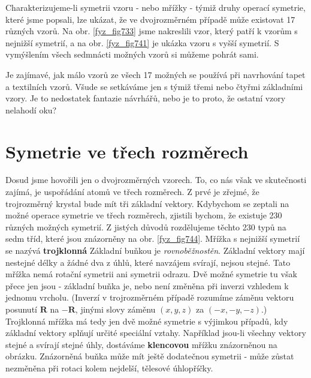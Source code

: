     Charakterizujeme-li symetrii vzoru - nebo mřížky - týmiž druhy operací symetrie, které jsme 
    popsali, lze ukázat, že ve dvojrozměrném případě může existovat \num{17} různých vzorů. Na obr. 
    \ref{fyz_fig733} jsme nakreslili vzor, který patří k vzorům s nejnižší symetrií, a na obr. 
    \ref{fyz_fig741} je ukázka vzoru s vyšší symetrií. S vymýšlením všech sedmnácti možných vzorů 
    si můžeme pohrát sami.
    
    Je zajímavé, jak málo vzorů ze všech \num{17} možných se používá při navrhování tapet a 
    textilních vzorů. Všude se setkáváme jen s týmiž třemi nebo čtyřmi základními vzory. Je to 
    nedostatek fantazie návrhářů, nebo je to proto, že ostatní vzory nelahodí oku?
    
  \section{Symetrie ve třech rozměrech}\label{fyz:IIchapXXXsecVI}
    Dosud jsme hovořili jen o dvojrozměrných vzorech. To, co nás však ve skutečnosti zajímá, je 
    uspořádání atomů ve třech rozměrech. Z prvé je zřejmé, že trojrozměrný krystal bude mít tři 
    základní vektory. Kdybychom se zeptali na možné operace symetrie ve třech rozměrech, zjistili 
    bychom, že existuje \num{230} různých možných symetrií. Z jistých důvodů rozdělujeme těchto 
    \num{230} typů na sedm tříd, které jsou znázorněny na obr. \ref{fyz_fig744}. Mřížka s nejnižší 
    symetrií se nazývá \textbf{trojklonná} Základní buňkou je \emph{rovnoběžnostěn}. Základní 
    vektory mají nestejné délky a žádné dva z úhlů, které navzájem svírají, nejsou stejné. Tato 
    mřížka nemá rotační symetrii ani symetrii odrazu. Dvě možné symetrie tu však přece jen jsou - 
    základní buňka je, nebo není změněna při inverzi vzhledem k jednomu vrcholu. (Inverzí v 
    trojrozměrném případě rozumíme záměnu vektoru posunutí \(\bm{R}\) na \(\bm{-R}\), jinými slovy 
    záměnu \((x, y, z)\) za \((-x, -y, -z)\).) Trojklonná mřížka má tedy jen dvě možné symetrie s 
    výjimkou případů, kdy základní vektory splňují určité speciální vztahy. Například jsou-li 
    všechny vektory stejné a svírají stejné úhly, dostáváme \textbf{klencovou} mřížku znázorněnou 
    na obrázku. Znázorněná buňka může mít ještě dodatečnou symetrii - může zůstat nezměněna při 
    rotaci kolem nejdelší, tělesové úhlopříčky.
    

